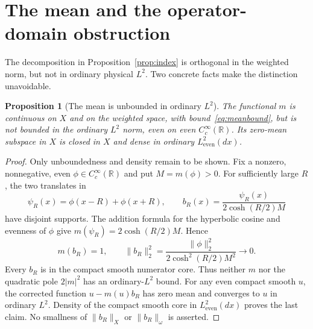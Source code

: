 \documentclass[11pt,a4paper]{article}
\numberwithin{equation}{section}
\newtheorem{proposition}[theorem]{Proposition}
\theoremstyle{definition}
\theoremstyle{remark}
\newcommand{\R}{\mathbb R}
\newcommand{\Le}{L^2_{\mathrm{even}}(dx)}
\newcommand{\norm}[1]{\lVert #1\rVert}
\begin{document}
\section{The mean and the operator-domain obstruction}\label{sec:mean}

The decomposition in Proposition~\ref{prop:index} is orthogonal in the weighted norm, but not in ordinary physical $L^2$. Two concrete facts make the distinction unavoidable.

\begin{proposition}[The mean is unbounded in ordinary $L^2$]\label{prop:mean}
The functional $m$ is continuous on $X$ and on the weighted space, with bound~\eqref{eq:meanbound}, but is not bounded in the ordinary $L^2$ norm, even on even $C_c^\infty(\R)$. Its zero-mean subspace in $X$ is closed in $X$ and dense in ordinary $\Le$.
\end{proposition}
\begin{proof}
Only unboundedness and density remain to be shown. Fix a nonzero, nonnegative, even $\phi\in C_c^\infty(\R)$ and put $M=m(\phi)>0$. For sufficiently large $R$, the two translates in
\[
 \psi_R(x)=\phi(x-R)+\phi(x+R),\qquad
 b_R(x)=\frac{\psi_R(x)}{2\cosh(R/2)M}
\]
have disjoint supports. The addition formula for the hyperbolic cosine and evenness of $\phi$ give $m(\psi_R)=2\cosh(R/2)M$. Hence
\begin{equation}\label{eq:unboundedmean}
 m(b_R)=1,\qquad
 \norm{b_R}_2^2=\frac{\norm{\phi}_2^2}{2\cosh^2(R/2)M^2}\longrightarrow0.
\end{equation}
Every $b_R$ is in the compact smooth numerator core. Thus neither $m$ nor the quadratic pole $2|m|^2$ has an ordinary-$L^2$ bound. For any even compact smooth $u$, the corrected function $u-m(u)b_R$ has zero mean and converges to $u$ in ordinary $L^2$. Density of the compact smooth core in $\Le$ proves the last claim. No smallness of $\norm{b_R}_X$ or $\norm{b_R}_\omega$ is asserted.
\end{proof}
\end{document}
